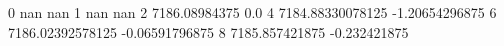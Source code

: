0 nan nan
1 nan nan
2 7186.08984375 0.0
4 7184.88330078125 -1.20654296875
6 7186.02392578125 -0.06591796875
8 7185.857421875 -0.232421875
